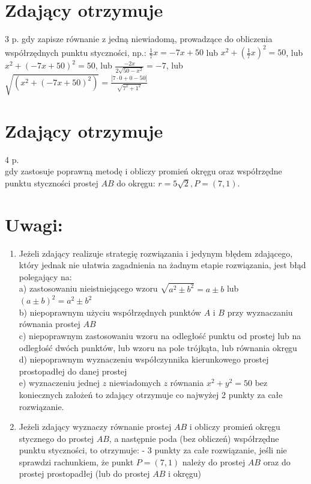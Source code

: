\documentclass[10pt]{article}
\begin{document}
\section*{Zdający otrzymuje}
3 p. gdy zapisze równanie z jedną niewiadomą, prowadzące do obliczenia współrzędnych punktu styczności, np.: $\frac{1}{7} x=-7 x+50$ lub $x^{2}+\left(\frac{1}{7} x\right)^{2}=50$, lub $x^{2}+(-7 x+50)^{2}=50$, lub $\frac{-2 x}{2 \sqrt{50-x^{2}}}=-7$, lub $\sqrt{\left(x^{2}+(-7 x+50)^{2}\right)}=\frac{|7 \cdot 0+0-50|}{\sqrt{7^{2}+1^{2}}}$

\section*{Zdający otrzymuje}
4 p.\\
gdy zastosuje poprawną metodę i obliczy promień okręgu oraz współrzędne punktu styczności prostej $A B$ do okręgu: $r=5 \sqrt{2}, P=(7,1)$.

\section*{Uwagi:}
\begin{enumerate}
  \item Jeżeli zdający realizuje strategię rozwiązania i jedynym błędem zdającego, który jednak nie ułatwia zagadnienia na żadnym etapie rozwiązania, jest błąd polegający na:\\
a) zastosowaniu nieistniejącego wzoru $\sqrt{a^{2} \pm b^{2}}=a \pm b$ lub $(a \pm b)^{2}=a^{2} \pm b^{2}$\\
b) niepoprawnym użyciu współrzędnych punktów $A$ i $B$ przy wyznaczaniu równania prostej $A B$\\
c) niepoprawnym zastosowaniu wzoru na odległość punktu od prostej lub na odległość dwóch punktów, lub wzoru na pole trójkąta, lub równania okręgu\\
d) niepoprawnym wyznaczeniu współczynnika kierunkowego prostej prostopadłej do danej prostej\\
e) wyznaczeniu jednej $z$ niewiadomych $z$ równania $x^{2}+y^{2}=50$ bez koniecznych założeń to zdający otrzymuje co najwyżej 2 punkty za całe rozwiązanie.
  \item Jeżeli zdający wyznaczy równanie prostej $A B$ i obliczy promień okręgu stycznego do prostej $A B$, a następnie poda (bez obliczeń) współrzędne punktu styczności, to otrzymuje: - 3 punkty za całe rozwiązanie, jeśli nie sprawdzi rachunkiem, że punkt $P=(7,1)$ należy do prostej $A B$ oraz do prostej prostopadłej (lub do prostej $A B$ i okręgu)
\end{enumerate}
\end{document}

